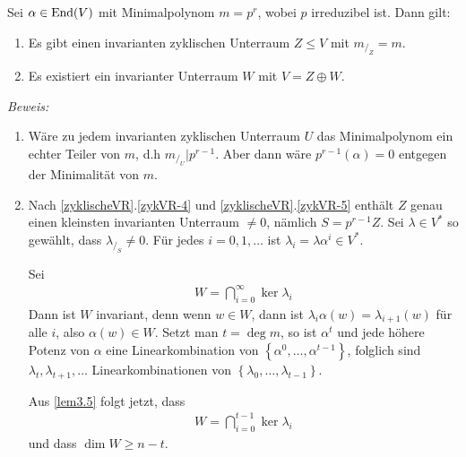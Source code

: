 
\begin{mysatz}\label{Existenz/zyklische/invarianteUR}

    Sei $\alpha \in \text{End}(V)$ mit Minimalpolynom $m = p^r$, wobei $p$ irreduzibel ist.
    Dann gilt:
    \begin{enumerate}
        \item Es gibt einen invarianten zyklischen Unterraum $Z \leq V$ mit $m_{/_Z} = m$.
        \item \label{eziUR-2} Es existiert ein invarianter Unterraum $W$ mit $V = Z \oplus W$.
    \end{enumerate}

    \textit{Beweis:}
    \begin{enumerate}
        \item Wäre zu jedem invarianten zyklischen Unterraum $U$ das Minimalpolynom ein echter Teiler von $m$, d.h $m_{/_U}| p^{r-1}$.
            Aber dann wäre $p^{r-1}(\alpha) = 0$ entgegen der Minimalität von $m$.
        \item Nach \ref{zyklischeVR}.\ref{zykVR-4} und \ref{zyklischeVR}.\ref{zykVR-5} enthält $Z$ genau einen kleinsten invarianten Unterraum $\neq 0$, nämlich $S = p^{r-1} Z$.
            Sei $\lambda \in V^{*}$ so gewählt, dass $\lambda_{/_S} \neq 0$.
            Für jedes $i = 0, 1, \ldots$ ist $\lambda_i = \lambda \alpha^{i} \in V^{*}$.

            Sei
            \begin{align*}
                W = \bigcap\limits_{i = 0}^{\infty} \ker \lambda_i
            \end{align*}
            Dann ist $W$ invariant, denn wenn $w \in W$, dann ist $\lambda_i \alpha(w) = \lambda_{i + 1} (w)$ für alle $i$, also $\alpha(w) \in W$.
            Setzt man $t = \deg m$, so ist $\alpha^t$ und jede höhere Potenz von $\alpha$ eine Linearkombination von $\left\{ \alpha^0, \ldots, \alpha^{t - 1} \right\}$,
            folglich sind $\lambda_t, \lambda_{t+1}, \ldots$ Linearkombinationen von $\left\{ \lambda_0, \ldots, \lambda_{t - 1} \right\}$.

            Aus \ref{lem3.5} folgt jetzt, dass
            \begin{align*}
                W = \bigcap\limits_{i = 0}^{t - 1} \ker \lambda_i
            \end{align*}
            und dass $\dim W \geq n-t$.


\end{enumerate}
\end{mysatz}
